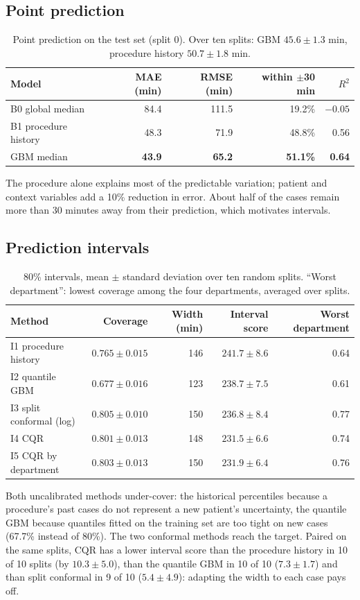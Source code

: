 \documentclass[11pt,a4paper]{article}
\begin{document}
\subsection{Point prediction}
\begin{table}[H]\centering\small
\begin{tabular}{lrrrr}\toprule
Model & MAE (min) & RMSE (min) & within $\pm$30 min & $R^2$ \\\midrule
B0 global median & 84.4 & 111.5 & 19.2\% & $-0.05$ \\
B1 procedure history & 48.3 & 71.9 & 48.8\% & 0.56 \\
GBM median & \textbf{43.9} & \textbf{65.2} & \textbf{51.1\%} & \textbf{0.64} \\\bottomrule
\end{tabular}
\caption{Point prediction on the test set (split 0). Over ten splits: GBM $45.6\pm1.3$ min, procedure history $50.7\pm1.8$ min.}
\end{table}
The procedure alone explains most of the predictable variation; patient and context variables add a 10\% reduction in
error. About half of the cases remain more than 30 minutes away from their prediction, which motivates intervals.

\subsection{Prediction intervals}
\begin{table}[H]\centering\small
\begin{tabular}{lrrrr}\toprule
Method & Coverage & Width (min) & Interval score & Worst department \\\midrule
I1 procedure history & $0.765\pm0.015$ & 146 & $241.7\pm8.6$ & 0.64 \\
I2 quantile GBM & $0.677\pm0.016$ & 123 & $238.7\pm7.5$ & 0.61 \\
I3 split conformal (log) & $0.805\pm0.010$ & 150 & $236.8\pm8.4$ & 0.77 \\
I4 CQR & $0.801\pm0.013$ & 148 & $\mathbf{231.5\pm6.6}$ & 0.74 \\
I5 CQR by department & $0.803\pm0.013$ & 150 & $231.9\pm6.4$ & 0.76 \\\bottomrule
\end{tabular}
\caption{80\% intervals, mean $\pm$ standard deviation over ten random splits. ``Worst department'': lowest coverage
among the four departments, averaged over splits.}\label{tab:int}
\end{table}
Both uncalibrated methods under-cover: the historical percentiles because a procedure's past cases do not represent
a new patient's uncertainty, the quantile GBM because quantiles fitted on the training set are too tight on new cases (67.7\% instead of 80\%). The two
conformal methods reach the target. Paired on the same splits, CQR has a lower interval score than the procedure
history in 10 of 10 splits (by $10.3\pm5.0$), than the quantile GBM in 10 of 10 ($7.3\pm1.7$) and than split
conformal in 9 of 10 ($5.4\pm4.9$): adapting the width to each case pays off.
\end{document}
